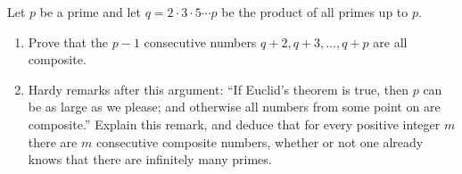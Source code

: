 Let $p$ be a prime and let $q=2\cdot3\cdot5\cdots p$ be the product of all primes up to $p$.
\begin{enumerate}
\item[(a)] Prove that the $p-1$ consecutive numbers $q+2,q+3,\dots,q+p$ are all composite.
\item[(b)] Hardy remarks after this argument: ``If Euclid's theorem is true, then $p$ can be as large as we please; and otherwise all numbers from some point on are composite.'' Explain this remark, and deduce that for every positive integer $m$ there are $m$ consecutive composite numbers, whether or not one already knows that there are infinitely many primes.
\end{enumerate}
